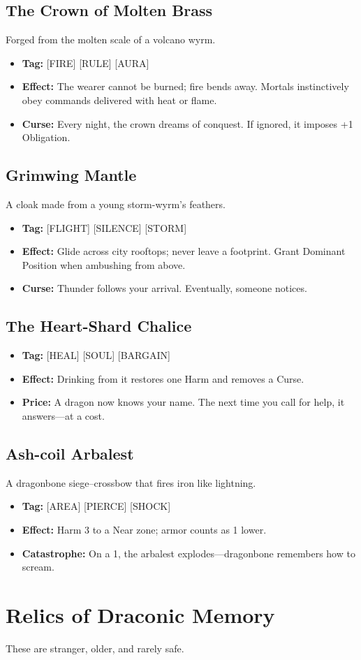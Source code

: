 \documentclass[11pt,letterpaper]{article}
\newcommand{\sectionheader}[1]{\section*{#1}}
\newcommand{\subsectionheader}[1]{\subsection*{#1}}
\begin{document}
\subsectionheader{The Crown of Molten Brass}
Forged from the molten scale of a volcano wyrm.
\begin{itemize}[leftmargin=*]
\item \textbf{Tag:} [FIRE] [RULE] [AURA]
\item \textbf{Effect:} The wearer cannot be burned; fire bends away.  
Mortals instinctively obey commands delivered with heat or flame.
\item \textbf{Curse:} Every night, the crown dreams of conquest.  
If ignored, it imposes +1 Obligation.
\end{itemize}

\subsectionheader{Grimwing Mantle}
A cloak made from a young storm-wyrm's feathers.
\begin{itemize}[leftmargin=*]
\item \textbf{Tag:} [FLIGHT] [SILENCE] [STORM]
\item \textbf{Effect:} Glide across city rooftops; never leave a footprint.  
Grant Dominant Position when ambushing from above.
\item \textbf{Curse:} Thunder follows your arrival. Eventually, someone notices.
\end{itemize}

\subsectionheader{The Heart-Shard Chalice}
\begin{itemize}[leftmargin=*]
\item \textbf{Tag:} [HEAL] [SOUL] [BARGAIN]
\item \textbf{Effect:} Drinking from it restores one Harm and removes a Curse.
\item \textbf{Price:} A dragon now knows your name.  
The next time you call for help, it answers---at a cost.
\end{itemize}

\subsectionheader{Ash-coil Arbalest}
A dragonbone siege--crossbow that fires iron like lightning.
\begin{itemize}[leftmargin=*]
\item \textbf{Tag:} [AREA] [PIERCE] [SHOCK]
\item \textbf{Effect:} Harm 3 to a Near zone; armor counts as 1 lower.
\item \textbf{Catastrophe:} On a 1, the arbalest explodes---dragonbone remembers how to scream.
\end{itemize}

\newpage

\sectionheader{Relics of Draconic Memory}

These are stranger, older, and rarely safe.
\end{document}
